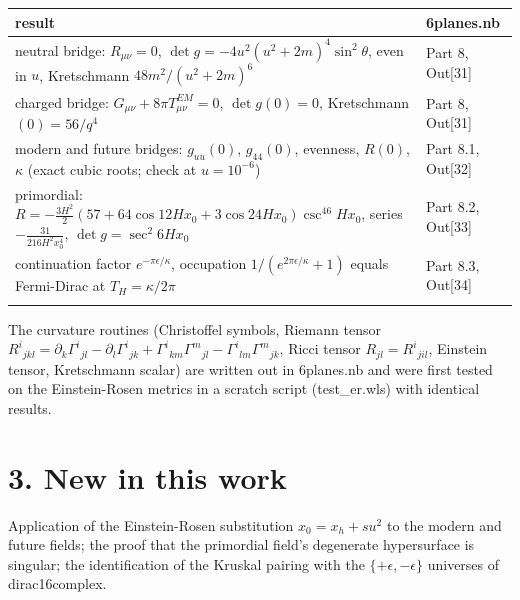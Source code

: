 \documentclass[10pt]{article}
\begin{document}
{\small\begin{longtable}{>{\raggedright\arraybackslash}p{}>{\raggedright\arraybackslash}p{}}\toprule
result & 6planes.nb \\\midrule\endhead
\bottomrule\endfoot
neutral bridge: $R_{\mu\nu}=0$, $\det g = -4u^2(u^2+2m)^4\sin^2\theta$, even in $u$, Kretschmann $48m^2/(u^2+2m)^6$ & Part 8, Out[31] \\*
charged bridge: $G_{\mu\nu}+8\pi T^{EM}_{\mu\nu}=0$, $\det g(0)=0$, Kretschmann$(0) = 56/q^4$ & Part 8, Out[31] \\*
modern and future bridges: $g_{uu}(0)$, $g_{44}(0)$, evenness, $R(0)$, $\kappa$ (exact cubic roots; check at $u=10^{-6}$) & Part 8.1, Out[32] \\*
primordial: $R = -\frac{3H^2}{2}(57+64\cos12Hx_0+3\cos24Hx_0)\csc^46Hx_0$, series $-\frac{31}{216H^2x_0^4}$, $\det g = \sec^2 6Hx_0$ & Part 8.2, Out[33] \\*
continuation factor $e^{-\pi\epsilon/\kappa}$, occupation $1/(e^{2\pi\epsilon/\kappa}+1)$ equals Fermi-Dirac at $T_H = \kappa/2\pi$ & Part 8.3, Out[34] \\*
\end{longtable}}

The curvature routines (Christoffel symbols, Riemann tensor $R^i{}_{jkl} = \partial_k\Gamma^i{}_{jl} - \partial_l\Gamma^i{}_{jk} + \Gamma^i{}_{km}\Gamma^m{}_{jl} - \Gamma^i{}_{lm}\Gamma^m{}_{jk}$, Ricci tensor $R_{jl} = R^i{}_{jil}$, Einstein tensor, Kretschmann scalar) are written out in 6planes.nb and were first tested on the Einstein-Rosen metrics in a scratch script (test\_er.wls) with identical results.


\section*{3. New in this work}

Application of the Einstein-Rosen substitution $x_0 = x_h + su^2$ to the modern and future fields; the proof that the primordial field's degenerate hypersurface is singular; the identification of the Kruskal pairing with the $\{+\epsilon,-\epsilon\}$ universes of dirac16complex.
\end{document}
